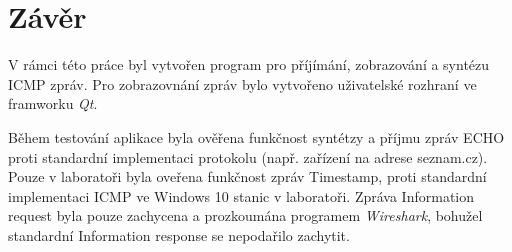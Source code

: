 \documentclass[12pt, a4paper]{article}
\begin{document}
\section{Závěr}

V rámci této práce byl vytvořen program pro příjímání, zobrazování a syntézu ICMP zpráv. Pro zobrazovnání zpráv bylo vytvořeno uživatelské rozhraní ve framworku \emph{Qt}.

Během testování aplikace byla ověřena funkčnost syntétzy a příjmu zpráv ECHO proti standardní implementaci protokolu (např. zařízení na adrese seznam.cz). Pouze v laboratoři byla oveřena funkčnost zpráv Timestamp, proti standardní implementaci ICMP ve Windows 10 stanic v laboratoři. Zpráva Information request byla pouze zachycena a prozkoumána programem \emph{Wireshark}, bohužel standardní Information response se nepodařilo zachytit.
\end{document}
